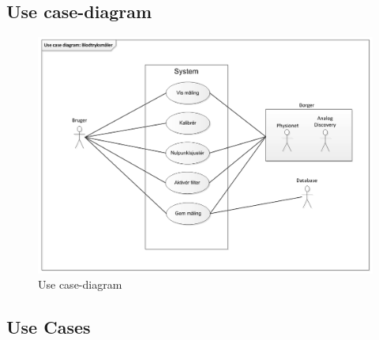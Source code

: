 \subsection{Use case-diagram}
\begin{figure}[H]
	\centering
	\includegraphics[width=1\textwidth]{Figurer/Snip20150929_8}
	\caption{Use case-diagram}
	\label{fig:Use case-diagram}
\end{figure}

\subsection{Use Cases}


